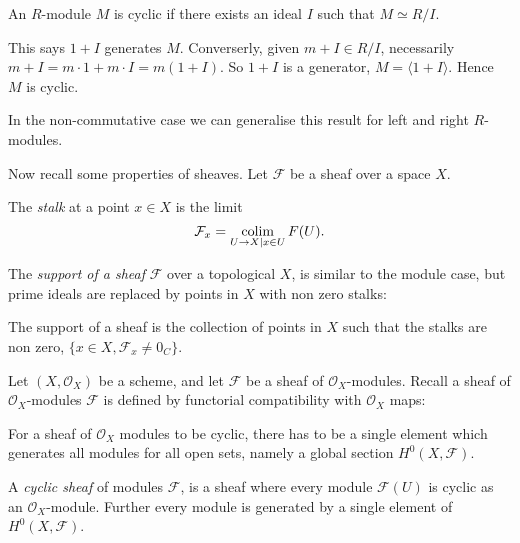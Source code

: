     \begin{corollary}
    An \(R\)-module \(M\) is cyclic if there exists an ideal \(I\) such that \(M \simeq R/I\).
    \end{corollary}
    This says \(1 + I\) generates \(M\). Converserly, given \( m + I \in R/I\), necessarily \( m + I = m \cdot 1 + m \cdot I = m ( 1 +  I)\). So \(1 + I\) is a generator, \(M = \langle 1 + I \rangle \). Hence \(M\) is cyclic.
    
    In the non-commutative case we can generalise this result for left and right \(R\)-modules.
    
    Now recall some properties of sheaves. Let \( \mathcal{F}\) be a sheaf over a space \(X\). 
    
    \begin{defn} The \emph{stalk} at a point \(x\in X\) is the limit
    \[ \mathcal{F}_x = \operatorname*{colim}_{U \rightarrow X | x\in U} F(U).\]
    \end{defn}
    
    The \emph{support of a sheaf} \( \mathcal{F}\) over a topological \(X\),  is similar to the module case, but prime ideals are replaced by points in \(X\) with non zero stalks:
    
    \begin{defn} 
    The support of a sheaf is the collection of points in \(X\) such that the stalks are non zero, \( \{x \in X, \mathcal{F}_x \neq 0_C \} \).
    \end{defn}
    
    Let \( (X, \mathcal{O}_X)\) be a scheme, and let \(\mathcal{F}\) be a sheaf of \( \mathcal{O}_X\)-modules. Recall a sheaf of \( \mathcal{O}_X\)-modules \(\mathcal{F}\) is defined by functorial compatibility with \( \mathcal{O}_X\) maps:
    \begin{center}
    \end{center}
    
    
    For a sheaf of \( \mathcal{O}_X\) modules to be cyclic, there has to be a single element which generates all modules for all open sets, namely a global section \(H^0(X,\mathcal{F})\).
    
    \begin{defn} 
    \label{defn:cyclicsheaf}
    A \emph{cyclic sheaf} of modules \(\mathcal{F}\), is a sheaf where every module
    \(\mathcal{F}(U)\) is cyclic as an \( \mathcal{O}_X\)-module. Further every module is generated by a single element of \(H^0(X,\mathcal{F})\).
    \end{defn}
    
